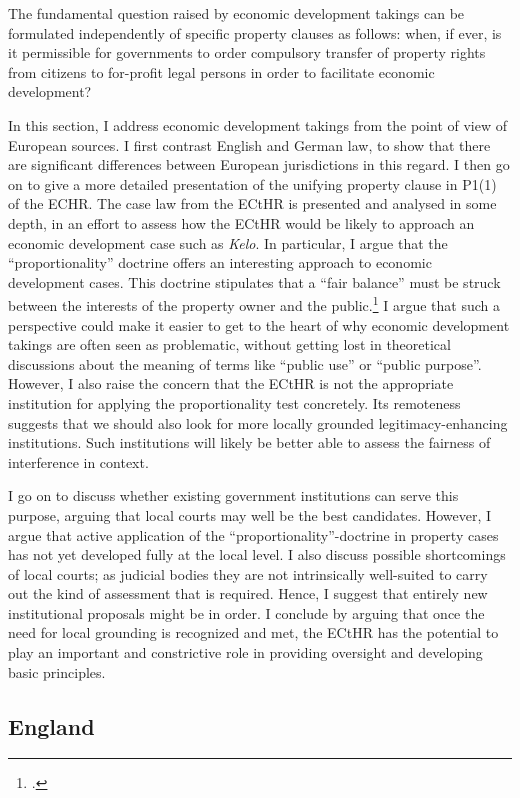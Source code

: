 The fundamental question raised by economic development takings can be formulated independently of specific property clauses as follows: when, if ever, is it permissible for governments to order compulsory transfer of property rights from citizens to for-profit legal persons in order to facilitate economic development? 

In this section, I address economic development takings from the point of view of European sources. I first contrast English and German law, to show that there are significant differences between European jurisdictions in this regard. I then go on to give a more detailed presentation of the unifying property clause in P1(1) of the ECHR. The case law from the ECtHR is presented and analysed in some depth, in an effort to assess how the ECtHR would be likely to approach an economic development case such as {\it Kelo}. In particular, I argue that the ``proportionality'' doctrine offers an interesting approach to economic development cases. This doctrine stipulates that a ``fair balance'' must be struck  between the interests of the property owner and the public.\footcite[Chapter 5]{allen05} I argue that such a perspective could make it easier to get to the heart of why economic development takings are often seen as problematic, without getting lost in theoretical discussions about the meaning of  terms like ``public use'' or ``public purpose''. However, I also raise the concern that the ECtHR is not the appropriate institution for applying the proportionality test concretely. Its remoteness suggests that we should also look for more locally grounded legitimacy-enhancing institutions. Such institutions will likely be better able to assess the fairness of interference in context.

I go on to discuss whether existing government institutions can serve this purpose, arguing that local courts may well be the best candidates. However, I argue that active application of the ``proportionality''-doctrine in property cases has not yet developed fully at the local level. I also discuss possible shortcomings of local courts; as judicial bodies they are not intrinsically well-suited to carry out the kind of assessment that is required. Hence, I suggest that entirely new institutional proposals might be in order. I conclude by arguing that once the need for local grounding is recognized and met, the ECtHR has the potential to play an important and constrictive role in providing oversight and developing basic principles.

\subsection{England}

